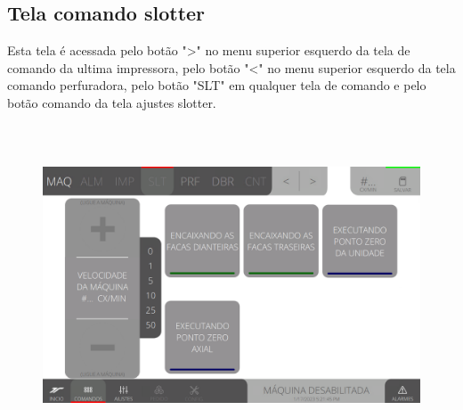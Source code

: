 \thispagestyle{fancy}
\vspace*{40 pt}
\subsection{Tela comando slotter}\label{telaComandoSlotter}
 Esta tela é acessada pelo botão "\textgreater" no menu superior esquerdo da tela de comando da ultima impressora, pelo botão "\textless{}" no menu superior esquerdo da tela comando perfuradora, pelo botão "SLT" em qualquer tela de comando e pelo botão comando da tela ajustes slotter.
 \vspace*{\fill}
 \begin{figure}[h]
  \centering
  \includegraphics[width=576px,height=360px]{src/imagesFlexo/05-slotter/commands/e-Tela-Principal.png}
\end{figure}
\vspace*{\fill}

\newpage
\thispagestyle{fancy}
\vspace*{40 pt}
